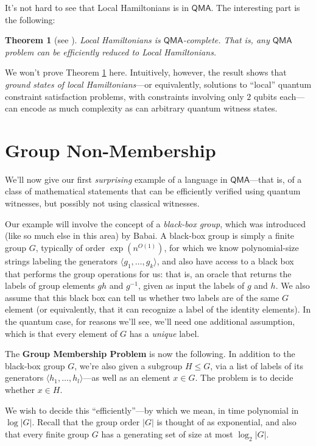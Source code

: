 \documentclass[12pt]{report}
\theoremstyle{plain}
\newtheorem{theorem}{Theorem}[section]
\theoremstyle{definition}
\begin{document}
It's not hard to see that Local Hamiltonians is in $\mathsf{QMA}$.  The interesting part is the following:

\begin{theorem}[see \cite{KSV02}]
\label{localham}
Local Hamiltonians is $\mathsf{QMA}$-complete.  That is, {\em any} $\mathsf{QMA}$ problem can be efficiently reduced to Local Hamiltonians.
\end{theorem}

We won't prove Theorem \ref{localham} here. Intuitively, however, the result shows that {\em ground states of local Hamiltonians}---or equivalently, solutions to ``local'' quantum constraint satisfaction problems, with constraints involving only $2$ qubits each---can encode as much complexity as can arbitrary quantum witness states.

\section{Group Non-Membership}

We'll now give our first {\em surprising} example of a language in $\mathsf{QMA}$---that is, of a class of mathematical statements that can be efficiently verified using quantum witnesses, but possibly not using classical witnesses.

Our example will involve the concept of a {\em black-box group}, which was introduced (like so much else in this area) by Babai.  A black-box group is simply
a finite group $G$, typically of order $\exp(n^{O(1)})$, for which we know polynomial-size strings labeling the generators $\langle g_1, \dots, g_k \rangle$, and also have access to a black box that performs the group operations for us: that is, an oracle that returns the labels of group elements $gh$ and $g^{-1}$, given as input the labels of $g$ and $h$.  We also assume that this black box can tell us whether two labels are of the same $G$ element (or equivalently, that it can recognize a label of the identity elements).  In the quantum case, for reasons we'll see, we'll need one additional assumption, which is that every element of $G$ has a {\em unique} label.

The \textbf{Group Membership Problem} is now the following.  In addition to the black-box group $G$, we're also given a subgroup $H \leq G$, via a list of labels of its generators $\langle h_1, \dots, h_l\rangle$---as well as an element $x \in G$.  The problem is to decide whether $x \in H$.

We wish to decide this ``efficiently''---by which we mean, in time polynomial in $\log |G|$.  Recall that the group order $|G|$ is thought of as exponential, and also that every finite group $G$ has a generating set of size at most $\log_2 |G|$.
\end{document}
